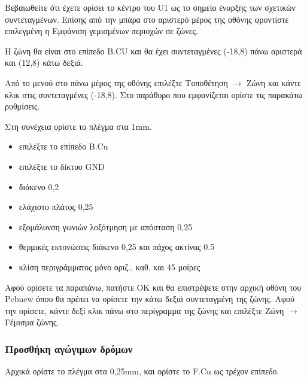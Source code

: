 \documentclass[a4paper]{article}
\begin{document}
Βεβαιωθείτε ότι έχετε ορίσει το κέντρο του U1  ως το σημείο έναρξης των σχετικών συντεταγμένων. Επίσης από την μπάρα στο αριστερό μέρος της οθόνης φροντίστε επιλεγμένη η Εμφάνιση γεμισμένων περιοχών σε ζώνες. %

Η ζώνη θα είναι στο επίπεδο B.CU και θα έχει συντεταγμένες (-18,8) πάνω αριστερά και (12,8) κάτω δεξιά. %

Από το μενού στο πάνω μέρος της οθόνης επιλέξτε Τοποθέτηση $\rightarrow$ Ζώνη και κάντε κλικ στις συντεταγμένες (-18,8). Στο παράθυρο που εμφανίζεται ορίστε τις παρακάτω ρυθμίσεις.


Στη συνέχεια ορίστε το πλέγμα στα 1mm.

\begin{itemize}
    \item επιλέξτε το επίπεδο B.Cu
    \item επιλέξτε το δίκτυο GND
    \item διάκενο 0,2
    \item ελάχιστο πλάτος 0,25
    \item εξομάλυνση γωνιών λοξότμηση με απόσταση 0,25
    \item θερμικές εκτονώσεις διάκενο 0,25 και πάχος ακτίνας 0.5
    \item κλίση περιγράμματος μόνο οριζ., καθ. και 45 μοίρες
\end{itemize}

Αφού ορίσετε τα παραπάνω, πατήστε ΟΚ και θα επιστρέψετε στην αρχική οθόνη του \textenglish{Pcbnew} όπου θα πρέπει να ορίσετε την κάτω δεξιά συντεταγμένη της ζώνης. Αφού την ορίσετε, κάντε δεξί κλικ πάνω στο περίγραμμα της ζώνης και επιλέξτε Ζώνη $\rightarrow$ Γέμισμα ζώνης.

\begin{figure}
  \begin{center}
    \label{fig:kicad-main}
  \end{center}
\end{figure}

\subsubsection{Προσθήκη αγώγιμων δρόμων}

Αρχικά ορίστε το πλέγμα στα 0,25mm, και ορίστε το F.Cu ως τρέχον επίπεδο.
\end{document}
